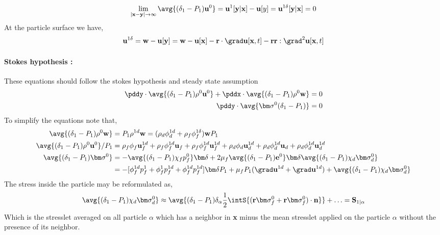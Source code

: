 \begin{equation*}
    \lim_{|\textbf{x} - \textbf{y}|\to\infty}
    \avg{(\delta_1 - P_1 ) \textbf{u}^0}
    = \textbf{u}^1[\textbf{y}|\textbf{x}] - \textbf{u}[y]
    = \textbf{u}^{1\delta}[\textbf{y}|\textbf{x}]
    = 0 
\end{equation*}
At the particle surface we have, 
\begin{equation*}
    \textbf{u}^{1\delta}
    = \textbf{w} - \textbf{u}[\textbf{y}]
    = 
    \textbf{w} - \textbf{u}[\textbf{x}]
    - \textbf{r}\cdot \grad \textbf{u}[\textbf{x},t] 
    - \textbf{rr} :  \grad^2 \textbf{u}[\textbf{x},t] 
\end{equation*}
\paragraph*{Stokes hypothesis :} These equations should follow the stokes hypothesis and steady state assumption  
\begin{align*}
    \pddy\cdot\avg{(\delta_1 - P_1)\rho^0\textbf{u}^0}
    + \pddx\cdot\avg{(\delta_1 - P_1)\rho^0\textbf{w}}
    = 0\\ 
    \pddy\cdot \avg{\bm\sigma^0 (\delta_1 - P_1)}
    = 0
\end{align*}
To simplify the equations note that, 
\begin{align*}
    \avg{(\delta_1 - P_1)\rho^0\textbf{w}}
    &= P_1 \rho^{1d}\textbf{w}
    = (\rho_d\phi_d^{1d} + \rho_f\phi_f^{1\delta})\textbf{w}P_1\\
    \avg{(\delta_1 - P_1)\rho^0\textbf{u}^0} / P_1
    &= 
    \rho_f\phi_f\textbf{u}^{1d}_f
    +\rho_f\phi_f^{1d}\textbf{u}_f
    +\rho_f\phi_f^{1d}\textbf{u}^{1d}_f
    + 
    \rho_d\phi_d\textbf{u}^{1d}_d
    +\rho_d\phi_d^{1d}\textbf{u}_d
    +\rho_d\phi_d^{1d}\textbf{u}^{1d}_d
    \\
    \avg{(\delta_1 - P_1)\bm\sigma^0} 
    &= 
    - \avg{(\delta_1 - P_1) \chi_fp^0_f}\bm\delta
    +2 \mu_f \avg{(\delta_1 - P_1) \textbf{e}^0}\bm\delta
    \avg{(\delta_1 - P_1) \chi_d\bm\sigma^0_d}\\
    &= 
    - [
        \phi_f^{1d} p^1_f
        +\phi_f^1 p^{1d}_f
        +\phi_f^{1d} p^{1d}_f
    ]\bm\delta P_1 
    +\mu_f P_1 (\grad \textbf{u}^{1d} + \grad \textbf{u}^{1d})
    + \avg{(\delta_1 - P_1) \chi_d\bm\sigma^0_d}
\end{align*}
The stress inside the particle may be reformulated as, 
\begin{equation*}
    \avg{(\delta_1 - P_1) \chi_d\bm\sigma^0_d}
    \approx 
    \avg{(\delta_1 - P_1) \delta_\alpha \frac{1}{2}\intS{(\textbf{r}\bm\sigma^0_f + \textbf{r}\bm\sigma_f^0)\cdot \textbf{n}}}
    +\ldots
    = \textbf{S}_{1|\alpha}
\end{equation*}
Which is the stresslet averaged on all particle $\alpha$ which has a neighbor in \textbf{x} minus the mean stresslet applied on the particle $\alpha$ without the presence of its neighbor. 

